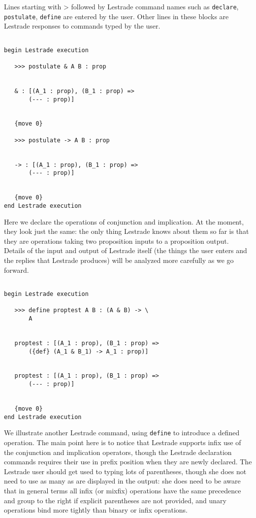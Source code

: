 \documentclass[12pt]{article}
\begin{document}
Lines starting with \verb >>>  followed by Lestrade command names such as {\tt declare}, {\tt postulate}, {\tt define} are entered by the user.  Other lines in these blocks are Lestrade responses to commands typed by the user.

\begin{verbatim}

begin Lestrade execution

   >>> postulate & A B : prop


   & : [(A_1 : prop), (B_1 : prop) => 
       (--- : prop)]


   {move 0}

   >>> postulate -> A B : prop


   -> : [(A_1 : prop), (B_1 : prop) => 
       (--- : prop)]


   {move 0}
end Lestrade execution
\end{verbatim}

Here we declare the operations of conjunction and implication.  At the moment, they look just the same:  the only thing Lestrade knows about them so far is that they are operations taking two proposition inputs to a proposition output.  Details of the input and output of Lestrade itself (the things the user enters and the replies that Lestrade produces) will be analyzed more carefully as we go forward.

\begin{verbatim}

begin Lestrade execution

   >>> define proptest A B : (A & B) -> \
       A


   proptest : [(A_1 : prop), (B_1 : prop) => 
       ({def} (A_1 & B_1) -> A_1 : prop)]


   proptest : [(A_1 : prop), (B_1 : prop) => 
       (--- : prop)]


   {move 0}
end Lestrade execution
\end{verbatim}

We illustrate another Lestrade command, using {\tt define} to introduce a defined operation.  The main point here is to notice that Lestrade supports
infix use of the conjunction and implication operators, though the Lestrade declaration commands requires their use in prefix position when they are newly declared.  The Lestrade user should get used to typing lots of parentheses, though she does not need to use as many as are displayed in the output:  she does need to be aware that in general terms all infix (or mixfix) operations have the same precedence and group to the right if explicit parentheses are not provided, and unary operations bind more tightly than binary or infix operations.
\end{document}
